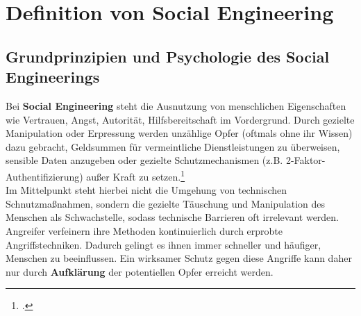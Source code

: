 \documentclass[12pt, a4paper, oneside]{scrartcl}
\begin{document}
\section{Definition von Social Engineering}

\subsection{Grundprinzipien und Psychologie des Social Engineerings}
Bei \textbf{Social Engineering} steht die Ausnutzung von menschlichen Eigenschaften wie 
Vertrauen, Angst, Autorität, Hilfsbereitschaft im Vordergrund. Durch gezielte Manipulation
oder Erpressung werden unzählige Opfer (oftmals ohne ihr Wissen) dazu gebracht, Geldsummen
für vermeintliche Dienstleistungen zu überweisen, sensible Daten anzugeben oder gezielte Schutzmechanismen
(z.B. 2-Faktor-Authentifizierung) außer Kraft zu setzen.\footcite{BSISocialEngineering}\\
Im Mittelpunkt steht hierbei nicht die Umgehung von technischen Schnutzmaßnahmen, sondern die gezielte
Täuschung und Manipulation des Menschen als Schwachstelle, sodass technische Barrieren 
oft irrelevant werden. Angreifer verfeinern ihre Methoden kontinuierlich durch erprobte Angriffstechniken. 
Dadurch gelingt es ihnen immer schneller und häufiger, Menschen zu beeinflussen.
Ein wirksamer Schutz gegen diese Angriffe kann daher nur durch \textbf{Aufklärung} der 
potentiellen Opfer erreicht werden.
\end{document}
